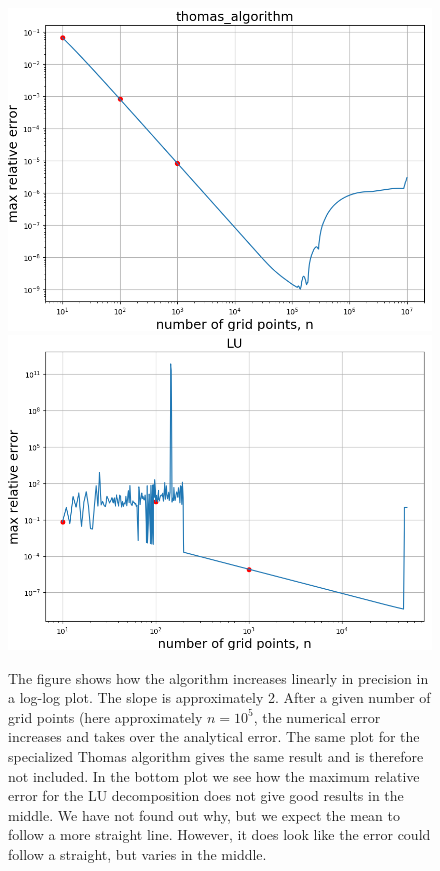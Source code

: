 \documentclass{emulateapj}
\begin{document}
\begin{figure}[h]
    \centering
    \includegraphics[scale=0.4]{error_data.png}
    \includegraphics[scale=0.4]{error_data_LU.png}
    \caption{The figure shows how the algorithm increases linearly in precision in a log-log plot. The slope is approximately 2. After a given number of grid points (here approximately \(n=10^{5}\), the numerical error increases and takes over the analytical error. The same plot for the specialized Thomas algorithm gives the same result and is therefore not included. In the bottom plot we see how the maximum relative error for the LU decomposition does not give good results in the middle. We have not found out why, but we expect the mean to follow a more straight line. However, it does look like the error could follow a straight, but varies in the middle.}
    \label{fig:error_data}
\end{figure}
\end{document}
